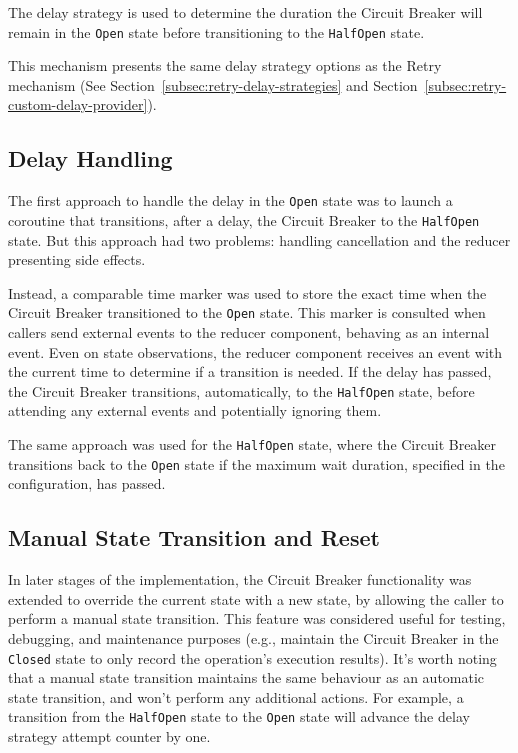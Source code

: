 The delay strategy is used
to determine the duration the Circuit Breaker will remain in the \texttt{Open} state before transitioning to the \texttt{HalfOpen} state.

This mechanism presents the same delay strategy options as the Retry mechanism (See Section~\ref{subsec:retry-delay-strategies} and Section~\ref{subsec:retry-custom-delay-provider}).

\subsection{Delay Handling}\label{subsec:cbreaker-delay-handling}

The first approach to handle the delay in the \texttt{Open} state was
to launch a coroutine that transitions, after a delay, the Circuit Breaker to the \texttt{HalfOpen} state.
But this approach had two problems: handling cancellation and the reducer presenting side effects.

Instead,
a comparable time marker was used to store the exact time when the Circuit Breaker transitioned to the \texttt{Open} state.
This marker is consulted when callers send external events to the reducer component,
behaving as an internal event.
Even on state observations, the reducer component receives an event with the current time to determine if a transition is needed.
If the delay has passed, the Circuit Breaker transitions, automatically, to the \texttt{HalfOpen} state,
before attending any external events and potentially ignoring them.

The same approach was used for the \texttt{HalfOpen} state,
where the Circuit Breaker transitions back to the \texttt{Open} state
if the maximum wait duration, specified in the configuration, has passed.

\subsection{Manual State Transition and Reset}\label{subsec:cbreaker-manual-state-transition}

In later stages of the implementation, the Circuit Breaker functionality was extended to override the current state with a new state,
by allowing the caller to perform a manual state transition.
This feature was considered useful for testing, debugging,
and maintenance purposes (e.g., maintain the Circuit Breaker in the \texttt{Closed} state to only record the operation's execution results).
It's worth noting that a manual state transition maintains the same behaviour as an automatic state transition,
and won't perform any additional actions.
For example,
a transition from the \texttt{HalfOpen} state to the \texttt{Open} state will advance the delay strategy attempt counter by one.

